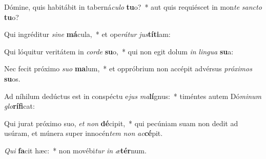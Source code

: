 \item Dómine, quis habitábit in taberná\textit{cu}\textit{lo} \textbf{tu}o?~* aut quis requiéscet in mon\textit{te} \textit{sanc}\textit{to} \textbf{tu}o?
\item Qui ingréditur \textit{si}\textit{ne} \textbf{má}cula,~* et ope\textit{rá}\textit{tur} \textit{jus}\textbf{tí}\textbf{ti}am:
\item Qui lóquitur veritátem in \textit{cor}\textit{de} \textbf{su}o,~* qui non egit dolum \textit{in} \textit{lin}\textit{gua} \textbf{su}a:
\item Nec fecit próximo \textit{su}\textit{o} \textbf{ma}lum,~* et oppróbrium non accépit advérsus \textit{pró}\textit{xi}\textit{mos} \textbf{su}os.
\item Ad níhilum dedúctus est in conspéctu e\textit{jus} \textit{ma}\textbf{lí}gnus:~* timéntes autem Dó\textit{mi}\textit{num} \textit{glo}\textbf{rí}\textbf{fi}cat:
\item Qui jurat próximo suo, \textit{et} \textit{non} \textbf{dé}cipit,~* qui pecúniam suam non dedit ad usúram, et múnera super innocén\textit{tem} \textit{non} \textit{ac}\textbf{cé}pit.
\item \textit{Qui} \textbf{fa}cit hæc:~* non movébi\textit{tur} \textit{in} \textit{æ}\textbf{tér}num.

